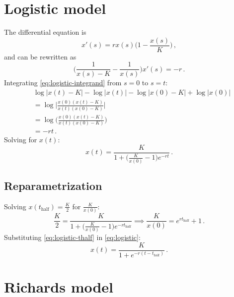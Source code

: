 \documentclass[12pt]{article}
\begin{document}
\setlength{\parskip}{3mm}
\setlength{\parindent}{7mm}

\section{Logistic model}

The differential equation is
%
\begin{equation}
  x'(s) = r x(s) \bigg(1 - \frac{x(s)}{K}\bigg)\,,
\end{equation}
%
and can be rewritten as
%
\begin{equation}
  \label{eq:logistic-integrand}
  \bigg(\frac{1}{x(s) - K} - \frac{1}{x(s)}\bigg) x'(s) = -r\,.
\end{equation}
%
Integrating \eqref{eq:logistic-integrand} from $s = 0$ to $s = t$:
%
\begin{equation}
  \begin{aligned}
    &\log|x(t) - K| - \log|x(t)| - \log|x(0) - K| + \log|x(0)| \\
    &= \log\bigg|\frac{x(0) (x(t) - K)}{x(t) (x(0) - K)}\bigg| \\
    &= \log\bigg(\frac{x(0) (x(t) - K)}{x(t) (x(0) - K)}\bigg) \\
    &= -rt\,.
  \end{aligned}
\end{equation}
%
Solving for $x(t)$:
%
\begin{equation}
  \label{eq:logistic}
  x(t) = \frac{K}{1 + \big(\frac{K}{x(0)} - 1\big) e^{-r t}}\,.
\end{equation}

\subsection{Reparametrization}

Solving $x(t_\text{half}) = \frac{K}{2}$ for $\frac{K}{x(0)}$:
%
\begin{equation}
  \label{eq:logistic-thalf}
  \frac{K}{2} = \frac{K}{1 + \big(\frac{K}{x(0)} - 1\big) e^{-r t_\text{half}}}
  \implies \frac{K}{x(0)} = e^{r t_\text{half}} + 1\,.
\end{equation}
%
Substituting \eqref{eq:logistic-thalf} in \eqref{eq:logistic}:
%
\begin{equation}
  x(t) = \frac{K}{1 + e^{-r (t - t_\text{half})}}\,.
\end{equation}

\section{Richards model}
\end{document}
